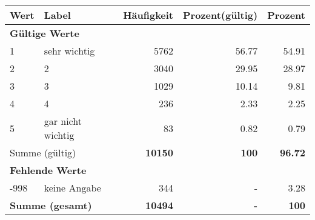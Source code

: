      \begin{longtable}{lXrrr}
     \toprule
     \textbf{Wert} & \textbf{Label} & \textbf{Häufigkeit} & \textbf{Prozent(gültig)} & \textbf{Prozent} \\
     \endhead
     \midrule
     \multicolumn{5}{l}{\textbf{Gültige Werte}}\\

     1 &
     \multicolumn{1}{X}{ sehr wichtig   } &


       \num{5762} &
       \num[round-mode=places,round-precision=2]{56.77} &
         \num[round-mode=places,round-precision=2]{54.91} \\

     2 &
     \multicolumn{1}{X}{ 2   } &


       \num{3040} &
       \num[round-mode=places,round-precision=2]{29.95} &
         \num[round-mode=places,round-precision=2]{28.97} \\

     3 &
     \multicolumn{1}{X}{ 3   } &


       \num{1029} &
       \num[round-mode=places,round-precision=2]{10.14} &
         \num[round-mode=places,round-precision=2]{9.81} \\

     4 &
     \multicolumn{1}{X}{ 4   } &


       \num{236} &
       \num[round-mode=places,round-precision=2]{2.33} &
         \num[round-mode=places,round-precision=2]{2.25} \\

     5 &
     \multicolumn{1}{X}{ gar nicht wichtig   } &


       \num{83} &
       \num[round-mode=places,round-precision=2]{0.82} &
         \num[round-mode=places,round-precision=2]{0.79} \\
     \midrule
     \multicolumn{2}{l}{Summe (gültig)} &
       \textbf{\num{10150}} &
     \textbf{\num{100}} &
       \textbf{\num[round-mode=places,round-precision=2]{96.72}} \\
     \multicolumn{5}{l}{\textbf{Fehlende Werte}}\\
       -998 &
       keine Angabe &
         \num{344} &
        - &
         \num[round-mode=places,round-precision=2]{3.28} \\
     \midrule
     \multicolumn{2}{l}{\textbf{Summe (gesamt)}} &
          \textbf{\num{10494}} &
        \textbf{-} &
        \textbf{\num{100}} \\
     \bottomrule
     \end{longtable}
     
